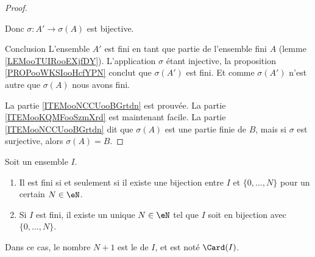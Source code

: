 \begin{proof}
\begin{subproof}
        Donc \( \sigma\colon A'\to \sigma(A)\) est bijective.
    \item[Conclusion]
        L'ensemble \( A'\) est fini en tant que partie de l'ensemble fini \( A\) (lemme \ref{LEMooTUIRooEXjfDY}). L'application \( \sigma\) étant injective, la proposition \ref{PROPooWKSIooHcfYPN} conclut que \( \sigma(A')\) est fini. Et comme \( \sigma(A')\) n'est autre que \( \sigma(A)\) nous avons fini.
    \end{subproof}
    La partie \ref{ITEMooNCCUooBGrtdn} est prouvée. La partie \ref{ITEMooKQMFooSzmXrd} est maintenant facile. La partie \ref{ITEMooNCCUooBGrtdn} dit que \( \sigma(A)\) est une partie finie de \( B\), mais si \( \sigma\) est surjective, alors \( \sigma(A)=B\).
\end{proof}

\begin{propositionDef}     \label{PROPooJLGKooDCcnWi}
    Soit un ensemble \( I\).
    \begin{enumerate}
        \item   \label{ITEMooMNMTooEOIjdo}
            Il est fini si et seulement si il existe une bijection entre \( I\) et \( \{ 0,\ldots, N \}\) pour un certain \( N\in \eN\).
        \item   \label{ITEMooZJFUooSNUSIk}
            Si \( I\) est fini, il existe un unique \( N\in \eN\) tel que \( I\) soit en bijection avec \( \{ 0,\ldots, N \}\).
    \end{enumerate}
    Dans ce cas, le nombre \( N+1\) est le  de \( I\), et est noté \( \Card(I)\).
\end{propositionDef}


